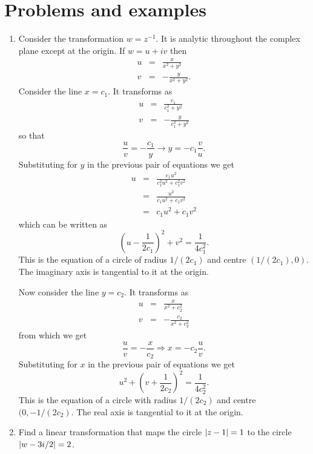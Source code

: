 \section{Problems and examples}\label{c3s2}
\begin{enumerate}
\item Consider the transformation $w = z^{-1}$. It is analytic throughout the
complex plane except at the origin. If $w = u + iv$ then
\begin{eqnarray*}
u &=& \frac{x}{x^2 + y^2} \\
v &=& -\frac{y}{x^2 + y^2}.
\end{eqnarray*}
Consider the line $x = c_1$. It transforms as
\begin{eqnarray*}
u &=& \frac{c_1}{c_1^2 + y^2} \\
v &=& -\frac{y}{c_1^2 + y^2}
\end{eqnarray*}
so that
\[
\frac{u}{v} = -\frac{c_1}{y} \rightarrow y = -c_1\frac{v}{u}.
\]
Substituting for $y$ in the previous pair of equations we get
\begin{eqnarray*}
u &=& \frac{c_1 u^2}{c_1^2u^2 + c_1^2v^2} \\
  &=& \frac{u^2}{c_1u^2 + c_1 v^2} \\
  &=& c_1u^2 + c_1v^2
\end{eqnarray*}
which can be written as
\[
\left(u - \frac{1}{2c_1}\right)^2 + v^2 = \frac{1}{4c_1^2}.
\]
This is the equation of a circle of radius $1/(2c_1)$ and centre $(1/(2c_1), 0)$.
The imaginary axis is tangential to it at the origin.

Now consider the line $y = c_2$. It transforms as
\begin{eqnarray*}
u &=& \frac{x}{x^2 + c_2^2} \\
v &=& -\frac{c_2}{x^2 + c_2^2}
\end{eqnarray*}
from which we get
\[
\frac{u}{v} = -\frac{x}{c_2} \Rightarrow x = -c_2\frac{u}{v}.
\]
Substituting for $x$ in the previous pair of equations we get
\[
u^2 + \left(v + \frac{1}{2c_2}\right)^2 = \frac{1}{4c_2^2}.
\]
This is the equation of a circle with radius $1/(2c_2)$ and centre $(0, -1/(2c_2)$.
The real axis is tangential to it at the origin.

\item Find a linear transformation that maps the circle $\left\vert{z - 1}\right\vert = 1$ to the
circle $\left\vert{w - 3i/2}\right\vert = 2$.


\end{enumerate}
